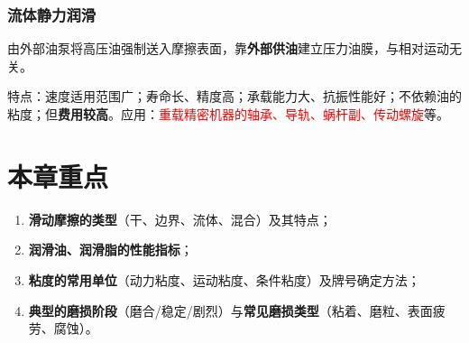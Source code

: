 \subsubsection{流体静力润滑}
\begin{definition}[流体静力润滑]
\label{def:流体静力润滑}
由外部油泵将高压油强制送入摩擦表面，靠\textbf{外部供油}建立压力油膜，与相对运动无关。

特点：速度适用范围广；寿命长、精度高；承载能力大、抗振性能好；不依赖油的粘度；但\textbf{费用较高}。应用：\textcolor{red}{重载精密机器的轴承、导轨、蜗杆副、传动螺旋}等。
\end{definition}

\section*{本章重点}

\begin{enumerate}
	\item \textbf{滑动摩擦的类型}（干、边界、流体、混合）及其特点；
	\item \textbf{润滑油、润滑脂的性能指标}；
	\item \textbf{粘度的常用单位}（动力粘度、运动粘度、条件粘度）及牌号确定方法；
	\item \textbf{典型的磨损阶段}（磨合/稳定/剧烈）与\textbf{常见磨损类型}（粘着、磨粒、表面疲劳、腐蚀）。
\end{enumerate}
